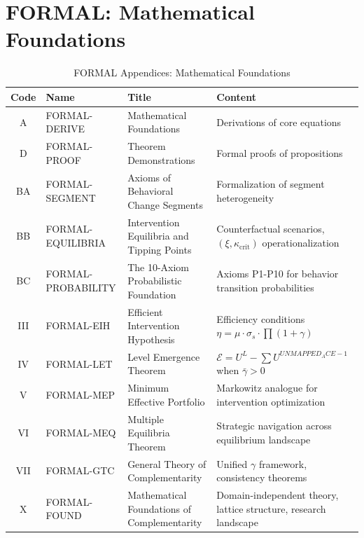 \section{FORMAL: Mathematical Foundations}
\label{sec:index-formal}

\begin{table}[htbp]
\centering
\caption{FORMAL Appendices: Mathematical Foundations}
\label{tab:index-formal}
\renewcommand{\arraystretch}{1.4}
\begin{tabular}{@{}clll@{}}
\toprule
\textbf{Code} & \textbf{Name} & \textbf{Title} & \textbf{Content} \\
\midrule
A & FORMAL-DERIVE & Mathematical Foundations & Derivations of core equations \\
D & FORMAL-PROOF & Theorem Demonstrations & Formal proofs of propositions \\
BA & FORMAL-SEGMENT & Axioms of Behavioral Change Segments & Formalization of segment heterogeneity \\
BB & FORMAL-EQUILIBRIA & Intervention Equilibria and Tipping Points & Counterfactual scenarios, $(\xi, \kappa_{\text{crit}})$ operationalization \\
BC & FORMAL-PROBABILITY & The 10-Axiom Probabilistic Foundation & Axioms P1-P10 for behavior transition probabilities \\
III & FORMAL-EIH & Efficient Intervention Hypothesis & Efficiency conditions $\eta = \mu \cdot \sigma_s \cdot \prod(1+\gamma)$ \\
IV & FORMAL-LET & Level Emergence Theorem & $\mathcal{E} = U^L - \sum U^{UNMAPPED_ACE-1}$ when $\bar{\gamma} > 0$ \\
V & FORMAL-MEP & Minimum Effective Portfolio & Markowitz analogue for intervention optimization \\
VI & FORMAL-MEQ & Multiple Equilibria Theorem & Strategic navigation across equilibrium landscape \\
VII & FORMAL-GTC & General Theory of Complementarity & Unified $\gamma$ framework, consistency theorems \\
X & FORMAL-FOUND & Mathematical Foundations of Complementarity & Domain-independent theory, lattice structure, research landscape \\

\end{tabular}
\end{table}
